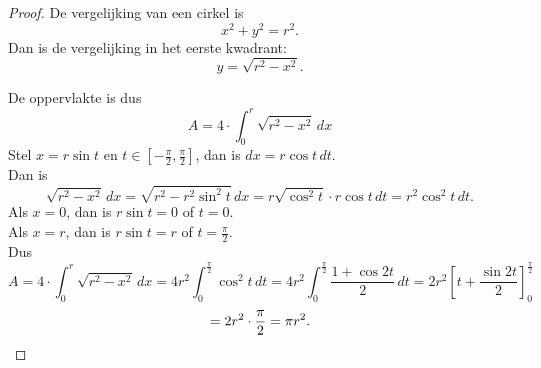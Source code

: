 \documentclass{article}
\begin{document}
\begin{proof}
De vergelijking van een cirkel is $$x^2+y^2=r^2.$$
Dan is de vergelijking in het eerste kwadrant:
$$y=\sqrt{r^2-x^2}.$$
De oppervlakte is dus
$$A=4\cdot \int_0^r\sqrt{r^2-x^2}\, dx$$
Stel $x=r\sin t$ en $t\in\left[-\frac{\pi}{2},\frac{\pi}{2}\right]$, dan is $dx =r\cos t\, dt$. 
\\ Dan is $$\sqrt{r^2-x^2}\,dx = \sqrt{r^2-r^2\sin^2t}\, dx=r\sqrt{\cos^2t}\cdot r\cos t\,dt = r^2\cos^2t\,dt.$$
Als $x=0$, dan is $r\sin t = 0$ of $t=0$.\\
Als $x=r$, dan is $r\sin t = r$ of $t=\frac{\pi}{2}$.\\
Dus $$A = 4\cdot\int_0^r \sqrt{r^2-x^2}\, dx =4r^2\int_0^\frac{\pi}{2}\cos^2t\,dt = 4r^2\int_0^\frac{\pi}{2} \frac{1+\cos2t}{2}\,dt = 2r^2\left[t + \frac{\sin2t}{2}\right]_0^\frac{\pi}{2}$$ $$=\\ 2r^2\cdot\frac{\pi}{2} = \pi r^2.$$


\end{proof}\newpage
\end{document}
